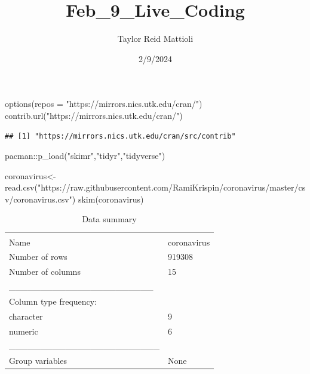 \documentclass[
]{article}
\title{Feb\_9\_Live\_Coding}
\author{Taylor Reid Mattioli}
\date{2/9/2024}
\newenvironment{Shaded}{\begin{snugshade}}{\end{snugshade}}
\newcommand{\AttributeTok}[1]{\textcolor[rgb]{0.77,0.63,0.00}{#1}}
\newcommand{\FunctionTok}[1]{\textcolor[rgb]{0.00,0.00,0.00}{#1}}
\newcommand{\NormalTok}[1]{#1}
\newcommand{\OtherTok}[1]{\textcolor[rgb]{0.56,0.35,0.01}{#1}}
\newcommand{\SpecialCharTok}[1]{\textcolor[rgb]{0.00,0.00,0.00}{#1}}
\newcommand{\StringTok}[1]{\textcolor[rgb]{0.31,0.60,0.02}{#1}}
\begin{document}
\maketitle

\begin{Shaded}
\begin{Highlighting}[]
\FunctionTok{options}\NormalTok{(}\AttributeTok{repos =} \StringTok{"https://mirrors.nics.utk.edu/cran/"}\NormalTok{)}
\FunctionTok{contrib.url}\NormalTok{(}\StringTok{"https://mirrors.nics.utk.edu/cran/"}\NormalTok{)}
\end{Highlighting}
\end{Shaded}

\begin{verbatim}
## [1] "https://mirrors.nics.utk.edu/cran/src/contrib"
\end{verbatim}

\begin{Shaded}
\begin{Highlighting}[]
\NormalTok{pacman}\SpecialCharTok{::}\FunctionTok{p\_load}\NormalTok{(}\StringTok{"skimr"}\NormalTok{,}\StringTok{"tidyr"}\NormalTok{,}\StringTok{"tidyverse"}\NormalTok{)}
\end{Highlighting}
\end{Shaded}

\begin{Shaded}
\begin{Highlighting}[]
\NormalTok{coronavirus}\OtherTok{\textless{}{-}}\FunctionTok{read.csv}\NormalTok{(}\StringTok{"https://raw.githubusercontent.com/RamiKrispin/coronavirus/master/csv/coronavirus.csv"}\NormalTok{)}
\FunctionTok{skim}\NormalTok{(coronavirus)}
\end{Highlighting}
\end{Shaded}

\begin{longtable}[]{@{}ll@{}}
\caption{Data summary}\tabularnewline
\toprule
& \\
\midrule
\endfirsthead
\toprule
& \\
\midrule
\endhead
Name & coronavirus \\
Number of rows & 919308 \\
Number of columns & 15 \\
\_\_\_\_\_\_\_\_\_\_\_\_\_\_\_\_\_\_\_\_\_\_\_ & \\
Column type frequency: & \\
character & 9 \\
numeric & 6 \\
\_\_\_\_\_\_\_\_\_\_\_\_\_\_\_\_\_\_\_\_\_\_\_\_ & \\
Group variables & None \\
\bottomrule
\end{longtable}
\end{document}
